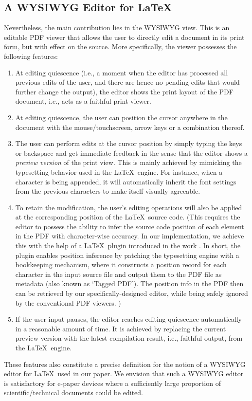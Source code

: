 \documentclass[]{sigchi}
\begin{document}
\subsection{A WYSIWYG Editor for \LaTeX}
Nevertheless, the main contribution lies in the WYSIWYG view.
This is an editable PDF viewer that allows the user to directly edit a document in its print form, but with effect on the source. More specifically, the viewer possesses the following features:
\begin{enumerate}
\item At editing quiescence (i.e., a moment when the editor has processed all previous edits of the user, and there are hence no pending edits that would further change the output), the editor shows the print layout of the PDF document, i.e., acts as a faithful print viewer. 
\item At editing quiescence, the user can position the cursor anywhere in the document with the mouse/touchscreen, arrow keys or a combination thereof.
\item The user can perform edits at the cursor position by simply typing the keys or backspace and get immediate feedback in the sense that the editor shows a \textit{preview version} of the print view. This is mainly achieved by mimicking the typesetting behavior used in the \LaTeX\ engine. For instance, when a character is being appended, it will automatically inherit the font settings from the previous characters to make itself visually agreeable.
\item To retain the modification, the user's editing operations will also be applied at the corresponding position of the \LaTeX\ source code. (This requires the editor to possess the ability to infer the source code position of each element in the PDF with character-wise accuracy. 
In our implementation, we achieve this with the help of a \LaTeX\ plugin introduced in the work \cite{elliott2018}. In short, the plugin enables position inference by patching the typesetting engine with a bookkeeping mechanism, where it constructs a position record for each character in the input source file and output them to the PDF file as metadata (also known as `Tagged PDF'). The position info in the PDF then can be retrieved by our specifically-designed editor, while being safely ignored by the conventional PDF viewers. )
\item If the user input pauses, the editor reaches editing quiescence automatically in a reasonable amount of time. It is achieved by replacing the current preview version with the latest compilation result, i.e., faithful output, from the \LaTeX\ engine.
\end{enumerate}
These features also constitute a precise definition for the notion of a WYSIWYG editor for \LaTeX\ used in our paper. We envision that such a WYSIWYG editor is satisfactory for e-paper devices where a sufficiently large proportion of scientific/technical documents could be edited.
\end{document}
